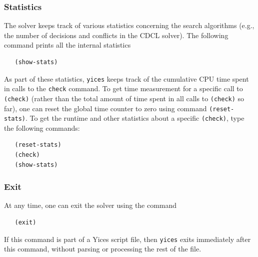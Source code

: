 \documentclass[11pt,twoside,fleqn,openright,titlepage]{cslreport}
\begin{document}
\subsubsection*{Statistics}

The solver keeps track of various statistics concerning the search
algorithms (e.g., the number of decisions and conflicts in the CDCL
solver). The following command prints all the internal statistics
\begin{small}
\begin{verbatim}
   (show-stats)
\end{verbatim}
\end{small}
As part of these statistics, \texttt{yices} keeps track of the
cumulative CPU time spent in calls to the \texttt{check} command.  To
get time measurement for a specific call to \texttt{(check)} (rather
than the total amount of time spent in all calls to \texttt{(check)}
so far), one can reset the global time counter to zero using command
\texttt{(reset-stats)}. To get the runtime and other statistics about
a specific \texttt{(check)}, type the following commands:
\begin{small}
\begin{verbatim}
   (reset-stats)
   (check)
   (show-stats)
\end{verbatim}
\end{small}

\subsubsection*{Exit}

At any time, one can exit the solver using the command
\begin{small}
\begin{verbatim}
   (exit)
\end{verbatim}
\end{small}
If this command is part of a Yices script file, then \texttt{yices}
exits immediately after this command, without parsing or processing the
rest of the file.







\end{document}
